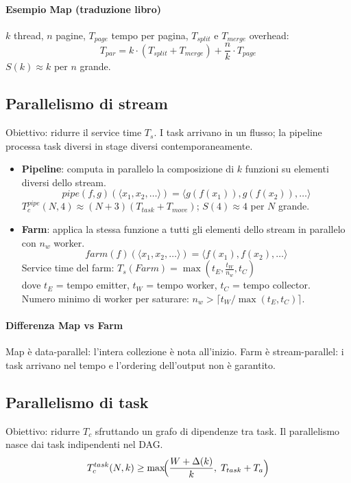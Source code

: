 \documentclass[11pt,a4paper]{article}
\theoremstyle{remark}
\begin{document}
\paragraph{Esempio Map (traduzione libro)}
$k$ thread, $n$ pagine, $T_{page}$ tempo per pagina, $T_{split}$ e $T_{merge}$ overhead:
\[
  T_{par} = k \cdot (T_{split} + T_{merge}) + \frac{n}{k} \cdot T_{page}
\]
$S(k) \approx k$ per $n$ grande.

\subsection{Parallelismo di stream}

Obiettivo: ridurre il service time $T_s$.
I task arrivano in un flusso; la pipeline processa task diversi in stage diversi contemporaneamente.

\begin{itemize}
  \item \textbf{Pipeline}: computa in parallelo la composizione di $k$ funzioni su elementi diversi dello stream.
    \[
      pipe(f,g)(\langle x_1,x_2,\ldots\rangle) = \langle g(f(x_1)), g(f(x_2)), \ldots\rangle
    \]
    $T_c^{pipe}(N, 4) \approx (N+3)(T_{task} + T_{move})$; $S(4) \approx 4$ per $N$ grande.
  \item \textbf{Farm}: applica la stessa funzione a tutti gli elementi dello stream in parallelo con $n_w$ worker.
    \[
      farm(f)(\langle x_1,x_2,\ldots\rangle) = \langle f(x_1), f(x_2), \ldots\rangle
    \]
    Service time del farm: $T_s(Farm) = \max\!\left(t_E, \frac{t_W}{n_w}, t_C\right)$\\
    dove $t_E$ = tempo emitter, $t_W$ = tempo worker, $t_C$ = tempo collector.\\
    Numero minimo di worker per saturare: $n_w > \lceil t_W / \max(t_E, t_C) \rceil$.
\end{itemize}

\paragraph{Differenza Map vs Farm}
Map è data-parallel: l'intera collezione è nota all'inizio. Farm è stream-parallel: i task arrivano nel tempo e l'ordering dell'output non è garantito.

\subsection{Parallelismo di task}

Obiettivo: ridurre $T_c$ sfruttando un grafo di dipendenze tra task.
Il parallelismo nasce dai task indipendenti nel DAG.
\[
  T_c^{task}(N, k) \geq \max\!\Bigl(\frac{W + \Delta(k)}{k},\; T_{task} + T_a\Bigr)
\]
\end{document}
